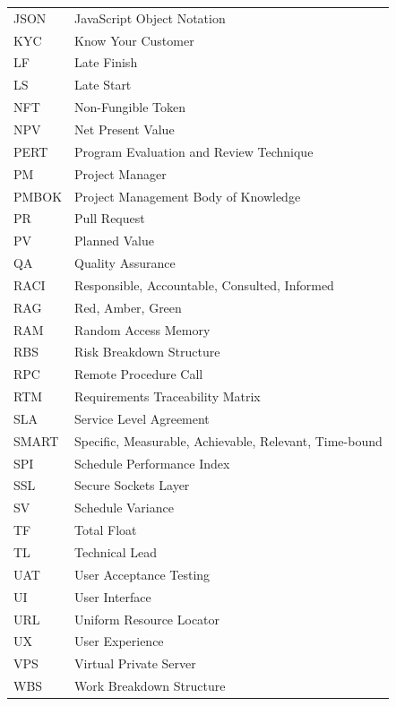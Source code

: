 \begin{longtable}{p{3cm}p{10.5cm}}
JSON & JavaScript Object Notation \\
KYC & Know Your Customer \\
LF & Late Finish \\
LS & Late Start \\
NFT & Non-Fungible Token \\
NPV & Net Present Value \\
PERT & Program Evaluation and Review Technique \\
PM & Project Manager \\
PMBOK & Project Management Body of Knowledge \\
PR & Pull Request \\
PV & Planned Value \\
QA & Quality Assurance \\
RACI & Responsible, Accountable, Consulted, Informed \\
RAG & Red, Amber, Green \\
RAM & Random Access Memory \\
RBS & Risk Breakdown Structure \\
RPC & Remote Procedure Call \\
RTM & Requirements Traceability Matrix \\
SLA & Service Level Agreement \\
SMART & Specific, Measurable, Achievable, Relevant, Time-bound \\
SPI & Schedule Performance Index \\
SSL & Secure Sockets Layer \\
SV & Schedule Variance \\
TF & Total Float \\
TL & Technical Lead \\
UAT & User Acceptance Testing \\
UI & User Interface \\
URL & Uniform Resource Locator \\
UX & User Experience \\
VPS & Virtual Private Server \\
WBS & Work Breakdown Structure \\
\bottomrule
\end{longtable}
